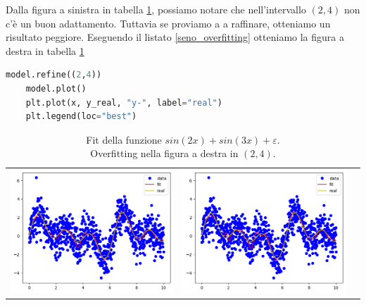 \documentclass[../main.tex]{subfiles}
\begin{document}
Dalla figura a sinistra in tabella \ref{tab:seno_fit}, possiamo notare che nell'intervallo $(2,4)$ non c'è un buon adattamento. Tuttavia se proviamo a 
a raffinare, otteniamo un risultato peggiore. Eseguendo il listato \ref{seno_overfitting} otteniamo la 
figura a destra in tabella \ref{tab:seno_fit}

\begin{lstlisting}[language=Python, caption={Overfitting nella somma di seni},label=seno_overfitting]
    model.refine((2,4))
    model.plot()
    plt.plot(x, y_real, "y-", label="real")
    plt.legend(loc="best")   
\end{lstlisting}

\begin{table}
    \centering
    \caption{Fit della funzione $sin(2x) + sin(3x) + \varepsilon$. \\ Overfitting nella figura a destra in $(2,4)$.\label{tab:seno_fit}}
        \begin{tabular}{ccc}
             \includegraphics[width=0.45\linewidth]{Immagini/esempi/somma_seni.png}
            & \includegraphics[width=0.45\linewidth]{Immagini/esempi/seno_overfit.png}\\[-4pt]
        \end{tabular}%
\end{table}
\end{document}
